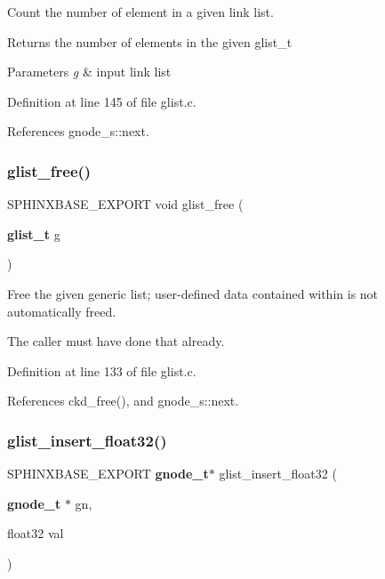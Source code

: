 Count the number of element in a given link list. 

\begin{DoxyReturn}{Returns}
the number of elements in the given glist\+\_\+t 
\end{DoxyReturn}

\begin{DoxyParams}{Parameters}
{\em g} & input link list \\
\hline
\end{DoxyParams}


Definition at line 145 of file glist.\+c.



References gnode\+\_\+s\+::next.

\mbox{\label{glist_8h_a45380e15d2c33afc554fd60a8828580c}} 
\subsubsection{glist\+\_\+free()}
{\footnotesize\ttfamily S\+P\+H\+I\+N\+X\+B\+A\+S\+E\+\_\+\+E\+X\+P\+O\+RT void glist\+\_\+free (\begin{DoxyParamCaption}\item[{\textbf{ glist\+\_\+t}}]{g }\end{DoxyParamCaption})}



Free the given generic list; user-\/defined data contained within is not automatically freed. 

The caller must have done that already. 

Definition at line 133 of file glist.\+c.



References ckd\+\_\+free(), and gnode\+\_\+s\+::next.

\mbox{\label{glist_8h_aff08aed022168872fc9d30cd299df2ce}} 
\subsubsection{glist\+\_\+insert\+\_\+float32()}
{\footnotesize\ttfamily S\+P\+H\+I\+N\+X\+B\+A\+S\+E\+\_\+\+E\+X\+P\+O\+RT \textbf{ gnode\+\_\+t}$\ast$ glist\+\_\+insert\+\_\+float32 (\begin{DoxyParamCaption}\item[{\textbf{ gnode\+\_\+t} $\ast$}]{gn,  }\item[{float32}]{val }\end{DoxyParamCaption})}



